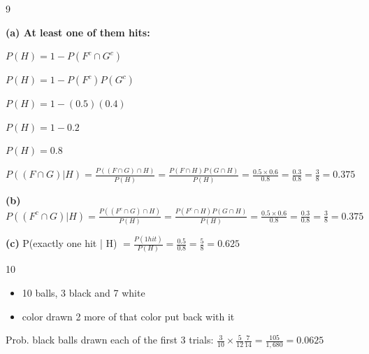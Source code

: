\documentclass[12 pt]{article}
\begin{document}
    \begin{exercise}{9}
    \hfill

    \textbf{(a) At least one of them hits:}

    $P(H) = 1 - P(F^c \cap G^c)$

    $P(H) = 1 - P(F^c)P(G^c)$

    $P(H) = 1 - (0.5)(0.4)$

    $P(H) = 1 - 0.2$

    $P(H) = 0.8$

    $P((F \cap G)|H) = \frac{P((F \cap G) \cap H)}{P(H)} = \frac{P(F \cap H) P(G \cap H)}{P(H)} = \frac{0.5 \times 0.6}{0.8} = \frac{0.3}{0.8} = \frac{3}{8} = 0.375$

    \hfill

    \textbf{(b)}
    $P((F^c \cap G)|H) = \frac{P((F^c \cap G) \cap H)}{P(H)} = \frac{P(F^c \cap H) P(G \cap H)}{P(H)} = \frac{0.5 \times 0.6}{0.8} = \frac{0.3}{0.8} = \frac{3}{8}  = 0.375$

    \hfill

    \textbf{(c)}
    P(exactly one hit | H) $ = \frac{P(1 hit)}{P(H)} = \frac{0.5}{0.8} = \frac{5}{8} = 0.625$
    \end{exercise}



    \begin{exercise}{10}
    \hfill

    \begin{itemize}
        \item 10 balls, 3 black and 7 white
        \item color drawn 2 more of that color put back with it
    \end{itemize}

    Prob. black balls drawn each of the first 3 trials: $\frac{3}{10} \times \frac{5}{12} \frac{7}{14} = \frac{105}{1,680} = 0.0625$
    \end{exercise}
\end{document}
